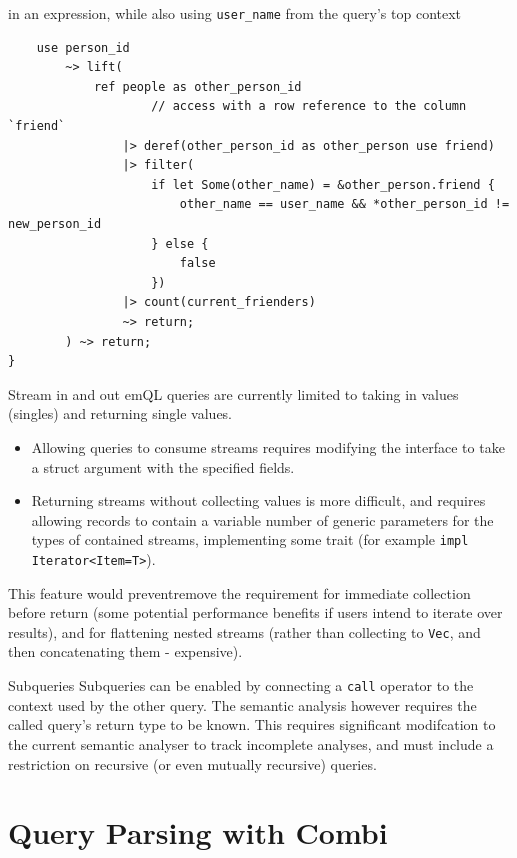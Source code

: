 in an expression, while also using \texttt{user_name} from the query's top context
\begin{verbatim}
    use person_id
        ~> lift(
            ref people as other_person_id
                    // access with a row reference to the column `friend`
                |> deref(other_person_id as other_person use friend)
                |> filter(
                    if let Some(other_name) = &other_person.friend { 
                        other_name == user_name && *other_person_id != new_person_id 
                    } else {
                        false 
                    })
                |> count(current_frienders)
                ~> return;
        ) ~> return;
}
\end{verbatim}

\begin{futurebox}{Stream in and out}
    emQL queries are currently limited to taking in values (singles) and returning single values.
    \begin{itemize}
        \setlength\itemsep{0em}
        \item Allowing queries to consume streams requires modifying the interface to take a struct argument with the specified fields.
        \item Returning streams without collecting values is more difficult, and requires allowing records to contain a variable number of generic parameters for the types of contained streams, implementing some trait (for example \texttt{impl Iterator<Item=T>}).
    \end{itemize}
    This feature would preventremove the requirement for immediate collection before return (some potential performance benefits if users intend to iterate over results), and for flattening nested streams (rather than collecting to \texttt{Vec}, and then concatenating them - expensive).
\end{futurebox}
\begin{futurebox}{Subqueries}
    Subqueries can be enabled by connecting a \texttt{call} operator to the context used by the other query. The semantic analysis however requires the called query's return type to be known.
    This requires significant modifcation to the current semantic analyser to track incomplete analyses, and must include a restriction on recursive (or even mutually recursive) queries.
\end{futurebox}
\section{Query Parsing with Combi}
